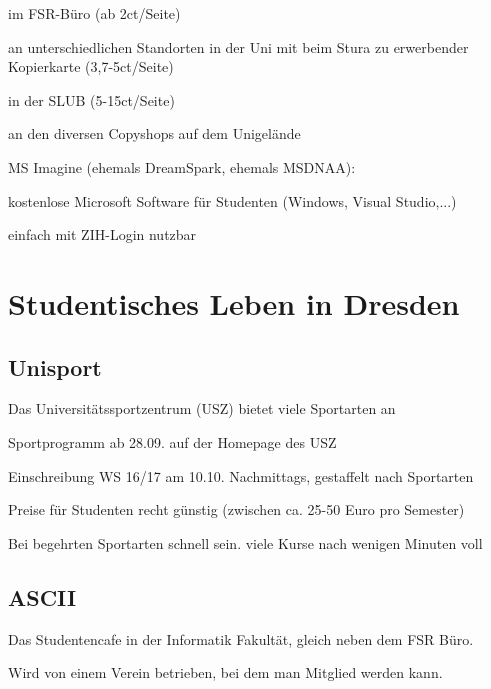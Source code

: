 \documentclass[a4paper,12pt]{report}
\begin{document}
\begin{itemize*}
	\begin{itemize*}
		\item im FSR-Büro (ab 2ct/Seite)
		\item an unterschiedlichen Standorten in der Uni mit beim Stura zu erwerbender Kopierkarte (3,7-5ct/Seite)
		\item in der SLUB (5-15ct/Seite)
		\item an den diversen Copyshops auf dem Unigelände
	\end{itemize*}
	\item MS Imagine (ehemals DreamSpark, ehemals MSDNAA):
	\begin{itemize*}
		\item kostenlose Microsoft Software für Studenten (Windows, Visual Studio,...)
		\item einfach mit ZIH-Login nutzbar
	\end{itemize*}
\end{itemize*}

\section{Studentisches Leben in Dresden}

\subsection{Unisport}
Das Universitätssportzentrum (USZ) bietet viele Sportarten an
\begin{itemize*}
\item Sportprogramm ab 28.09. auf der Homepage des USZ
\item Einschreibung WS 16/17 am 10.10. Nachmittags, gestaffelt nach Sportarten
\item Preise für Studenten recht günstig (zwischen ca. 25-50 Euro pro Semester)
\item Bei begehrten Sportarten schnell sein. viele Kurse nach wenigen Minuten voll
\end{itemize*}

\subsection{ASCII}
\begin{itemize*}
\item Das Studentencafe in der Informatik Fakultät, gleich neben dem FSR Büro.
\item Wird von einem Verein betrieben, bei dem man Mitglied werden kann.
\end{itemize*}
\end{document}
